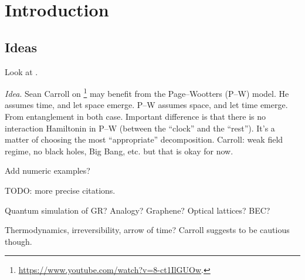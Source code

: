 \chapter{Introduction}

\section{Ideas}

Look at \cite{
    CarrollMereo,
    ColafrancheschiPhD,
    szpak2014curved,
    Josset_2017_thermo,
    EinsteinFromEntanglement,
    speranza2018eeg,
    GRQO_2020,
    Shore_QGO,
    OQEG,
    QSimCurved,
    SpacetimeFromEntanglement,
    CMFT,
    SMQO1}.

\emph{Idea}. Sean Carroll on \footnote{ \url{https://www.youtube.com/watch?v=8-ct1IlGUOw}. }
may benefit from the Page--Wootters (P--W) model. He assumes time, and let space emerge.
P--W assumes space, and let time emerge. From entanglement in both case. Important difference
is that there is no interaction Hamiltonin in P--W (between the ``clock'' and the ``rest'').
It's a matter of choosing the most ``appropriate'' decomposition. Carroll: weak field regime,
no black holes, Big Bang, etc. but that is okay for now.

Add numeric examples?

TODO: more precise citations.

Quantum simulation of GR? Analogy? Graphene? Optical lattices? BEC?

Thermodynamics, irreversibility, arrow of time? Carroll suggests to be cautious though.

